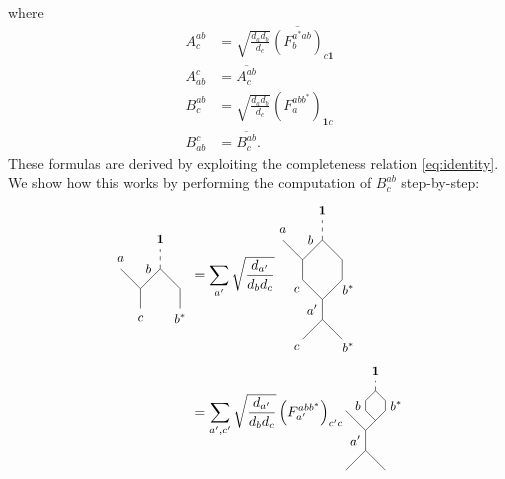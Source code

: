 where
	\begin{align}
		A_c^{ab}&=\sqrt{\frac{d_a d_b}{d_c}}\overline{\left(F_b^{a^*a b}\right)}_{c\mathbf{1}} \label{eq:A}\\
		A_{ab}^c&=\overline{A_c^{ab}} \label{eq:As}\\
		B_c^{ab}&=\sqrt{\frac{d_a d_b}{d_c}}\left(F_a^{a b b^*}\right)_{\mathbf{1}c} \label{eq:B}\\
		B_{ab}^c&=\overline{B_c^{ab}}.\label{eq:Bs}
	\end{align}
These formulas are derived by exploiting the completeness relation \cref{eq:identity}. We show how this works by performing the computation of $B_c^{ab}$ step-by-step:
	\begin{align}
		\begin{tikzpicture}[baseline=(current bounding box.center)]
			\draw (0,1) -- (0.5,0.5) -- (1,1) -- (1.5,0.5) -- (1.5,0);
			\draw[dashed] (1,1) -- (1,1.5);
			\node at (1,1.75) {\small $\mathbf{1}$};
			\draw (0.5,0.5) -- (0.5,0);
			\node at (0,1.25) {\small $a$};
			\node at (0.7,1) {\small $b$};
			\node at (1.5,-0.25) {\small $b^*$};
			\node at (0.5,-0.25) {\small $c$};
		\end{tikzpicture}&=\sum_{a'}\sqrt{\frac{d_{a'}}{d_b d_c}}
		\begin{tikzpicture}[baseline=(current bounding box.center)]
			\draw (0,1) -- (0.5,0.5) -- (1,1) -- (1.5,0.5) -- (1.5,0);
			\draw (0.5,0) -- (1,-0.5) -- (1.5,0);
			\draw (1,-0.5) to node[left] {\small $a'$} (1,-1);
			\draw (0.5,-1.5) -- (1,-1) -- (1.5,-1.5);
			\draw[dashed] (1,1) -- (1,1.5);
			\node at (1,1.75) {\small $\mathbf{1}$};
			\draw (0.5,0.5) -- (0.5,0);
			\node at (0,1.25) {\small $a$};
			\node at (0.7,1) {\small $b$};
			\node at (1.65,-0.25) {\small $b^*$};
			\node at (0.35,-0.25) {\small $c$};
			\node at (1.65,-1.7) {\small $b^*$};
			\node at (0.35,-1.7) {\small $c$};
		\end{tikzpicture}\\
		&=\sum_{a',c'}\sqrt{\frac{d_{a'}}{d_b d_c}}\left(F_{a'}^{abb^*}\right)_{c'c}
		\begin{tikzpicture}[baseline=(current bounding box.center)]
			\draw (0.5,0) -- (1,-0.5) -- (1.5,0);
			\draw (1.25,-0.25) -- (1,0);
			\draw (1,0) to node[left] {\small $b$} (1,0.25);
			\draw (1,0.25) -- (1.25,0.5);
			\draw (1.5,0) to node[right] {\small $b^*$} (1.5,0.25);
			\draw (1.5,0.25) -- (1.25,0.5);
			\draw[dashed] (1.25,0.5) -- (1.25,0.75);
			\node at (1.25,1) {\small $\mathbf{1}$};
			\draw (1,-0.5) to node[left] {\small $a'$} (1,-1);
			\draw (0.5,-1.5) -- (1,-1) -- (1.5,-1.5);

\end{tikzpicture}
\end{align}
